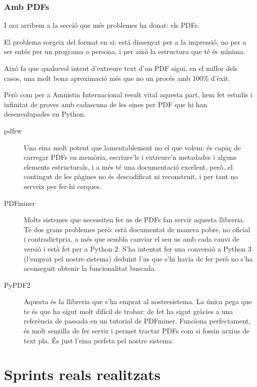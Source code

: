 \documentclass{article}
\begin{document}
\newpage

\subsubsection{Amb PDFs}

I ara arribem a la secció que més problemes ha donat: els PDFs.

El problema sorgeix del format en si: está dissenyat per a la impressió, no per a ser entés per un programa o persona, i per això la estructura que té és mínima.

Aixó fa que qualsevol intent d'extreure text d'un PDF sigui, en el millor dels casos, una molt bona aproximació més que no un procés amb 100\% d'èxit.

Però com per a Amnistia Internacional result vital aquesta part, hem fet estudis i infinitat de proves amb cadascuna de les eines per PDF que hi han desenvolupades en Python.


\begin{description}
    \item[pdfrw] Una eina molt potent que lamentablement no el que volem: és capaç de carregar PDFs en memòria, escriure'ls i extreure'n metadades i alguns elements estructurals, i a més té una documentació excelent, però\ldots el contingut de les pàgines no és descodificat ni reconstruit, i per tant no serveix per fer-hi cerques.
    \item[PDFminer] Molts sistemes que necessiten fer us de PDFs fan servir aquesta llibreria. Té dos grans problemes però: està documentat de manera pobre, no oficial i contradictpria, a més que sembla canviar el seu us amb cada canvi de versió i està fet per a Python 2. S'ha intentat fer una conversió a Python 3 (l'emprat pel nostre sistema) deduïnt l'us que s'hi havia de fer però no s'ha aconseguit obtenir la funcionalitat buscada.
    \item[PyPDF2] Aquesta és la llibreria que s'ha emprat al nostresistema. La única pega que te és que ha sigut molt difícil de trobar: de fet ha sigut gràcies a una referència de passada en un tutorial de PDFminer. Funciona perfectament, és molt senzilla de fer servir i permet tractar PDFs com si fossin arxius de text pla. És just l'eina perfeta pel nostre sistema.
\end{description}

\newpage

\section{Sprints reals realitzats}
\end{document}

